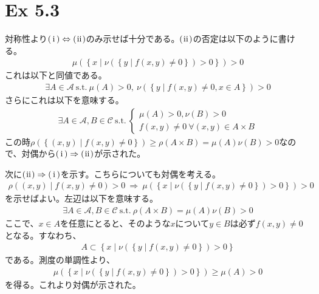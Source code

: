 \documentclass{article}
\begin{document}
\section{Ex 5.3}
対称性より$\rm(\hspace{.18em}i\hspace{.18em}) \Leftrightarrow \rm(\hspace{.08em}ii\hspace{.08em})$のみ示せば十分である。$\rm(\hspace{.08em}ii\hspace{.08em})$の否定は以下のように書ける。
\begin{align*}
	\mu\left( \left\{ x \mid \nu\left( \left\{ y \mid f(x, y) \neq 0 \right\} \right) > 0 \right\} \right) > 0
\end{align*}
これは以下と同値である。
\begin{align*}
	\exists A \in \mathcal{A}\ \text{s.t.}\ \mu(A) > 0,\ \nu\left( \left\{ y \mid f(x, y) \neq 0 , x\in A \right\} \right) > 0
\end{align*}
さらにこれは以下を意味する。
\begin{align*}
	\exists A \in \mathcal{A}, B \in \mathcal{C}\ \text{s.t.}\ \begin{cases} \mu(A) > 0, \nu(B) > 0 \\[8pt] f(x, y) \neq 0\ \forall (x, y) \in A \times B \end{cases}
\end{align*}
この時$\rho(\left\{ (x, y)\mid f(x, y) \neq 0 \right\}) \geq \rho(A \times B) = \mu(A) \nu(B) > 0$なので、対偶から$\rm(\hspace{.18em}i\hspace{.18em}) \Rightarrow \rm(\hspace{.08em}ii\hspace{.08em})$が示された。

次に$\rm(\hspace{.08em}ii\hspace{.08em}) \Rightarrow \rm(\hspace{.18em}i\hspace{.18em})$を示す。こちらについても対偶を考える。
\begin{align*}
	\rho\left( (x, y) \mid f(x, y) \neq 0\right) > 0 \ \Rightarrow \ \mu\left( \left\{ x \mid \nu\left( \left\{ y \mid f(x, y) \neq 0 \right\} \right) > 0 \right\} \right) > 0
\end{align*}
を示せばよい。左辺は以下を意味する。
\begin{align*}
	\exists A\in \mathcal{A}, B \in \mathcal{C}\ \text{s.t.}\ \rho(A \times B) = \mu (A) \nu(B) > 0
\end{align*}
ここで、$x\in A$を任意にとると、そのような$x$について$y \in B$は必ず$f(x, y) \neq 0$となる。すなわち、
\begin{align*}
	A \subset \left\{ x \mid \nu\left( \left\{ y \mid f(x, y) \neq 0 \right\} \right) > 0 \right\} 
\end{align*}
である。測度の単調性より、
\begin{align*}
	\mu\left( \left\{ x \mid \nu\left( \left\{ y \mid f(x, y) \neq 0 \right\} \right) > 0 \right\} \right) \geq \mu(A) > 0
\end{align*}
を得る。これより対偶が示された。
\end{document}
